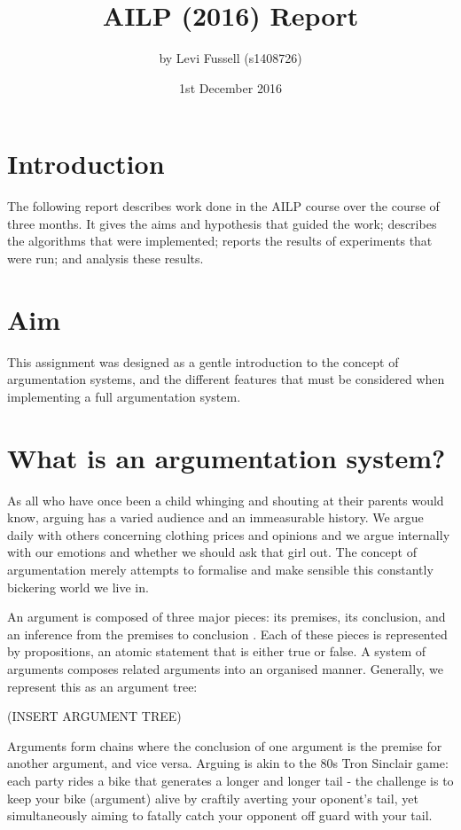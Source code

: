 \documentclass[10pt,a4paper,twocolumn]{article}
\title{AILP (2016) Report}               %
\author{by Levi Fussell (s1408726)}
\date{1st December 2016}                 %
\begin{document}
\maketitle  %
%
\section{Introduction}

The following report describes work done in the AILP
course over the course of three months. It gives the aims and hypothesis that guided the work;
describes the algorithms that were implemented; reports the results
of experiments that were run; and analysis these results.

\section{Aim}

This assignment was designed as a gentle introduction to the concept of argumentation systems,
and the different features that must be considered when implementing a full
argumentation system.

\section{What is an argumentation system?}

As all who have
once been a child whinging and shouting at their parents would know, arguing has
a varied audience and an immeasurable history. We argue daily
with others concerning clothing prices and opinions and we argue internally with our
emotions and whether we should ask that girl out. The concept of argumentation merely attempts to
formalise and make sensible this constantly bickering world we live in.

An argument is composed of three major pieces: its premises, its conclusion,
and an inference from the premises to conclusion \cite{ES2}. Each of
these pieces is represented by propositions, an atomic statement that is either
true or false. A system of arguments composes related arguments into an
organised manner. Generally, we represent this as an argument tree:

(INSERT ARGUMENT TREE)

Arguments form chains where the conclusion of one argument is the premise for
another argument, and vice versa. Arguing is akin to the 80s Tron Sinclair game:
each party rides a bike that generates a longer and longer tail - the
challenge is to keep your bike (argument) alive by craftily averting your
oponent's tail, yet
simultaneously aiming to fatally catch your opponent off guard with your tail.
\end{document}
